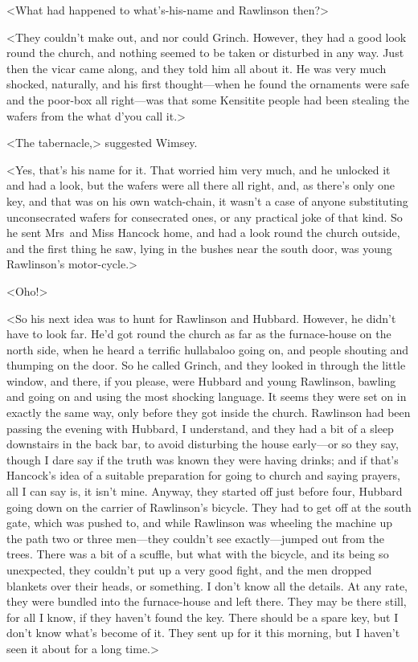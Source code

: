 <What had happened to what's-his-name and Rawlinson then?>

<They couldn't make out, and nor could Grinch. However, they had a good look round the church, and nothing seemed to be taken or disturbed in any way. Just then the vicar came along, and they told him all about it. He was very much shocked, naturally, and his first thought—when he found the ornaments were safe and the poor-box all right—was that some Kensitite people had been stealing the wafers from the what d'you call it.>

<The tabernacle,> suggested Wimsey.

<Yes, that's his name for it. That worried him very much, and he unlocked it and had a look, but the wafers were all there all right, and, as there's only one key, and that was on his own watch-chain, it wasn't a case of anyone substituting unconsecrated wafers for consecrated ones, or any practical joke of that kind. So he sent Mrs~and Miss Hancock home, and had a look round the church outside, and the first thing he saw, lying in the bushes near the south door, was young Rawlinson's motor-cycle.>

<Oho!>

<So his next idea was to hunt for Rawlinson and Hubbard. However, he didn't have to look far. He'd got round the church as far as the furnace-house on the north side, when he heard a terrific hullabaloo going on, and people shouting and thumping on the door. So he called Grinch, and they looked in through the little window, and there, if you please, were Hubbard and young Rawlinson, bawling and going on and using the most shocking language. It seems they were set on in exactly the same way, only before they got inside the church. Rawlinson had been passing the evening with Hubbard, I understand, and they had a bit of a sleep downstairs in the back bar, to avoid disturbing the house early—or so they say, though I dare say if the truth was known they were having drinks; and if that's Hancock's idea of a suitable preparation for going to church and saying prayers, all I can say is, it isn't mine. Anyway, they started off just before four, Hubbard going down on the carrier of Rawlinson's bicycle. They had to get off at the south gate, which was pushed to, and while Rawlinson was wheeling the machine up the path two or three men—they couldn't see exactly—jumped out from the trees. There was a bit of a scuffle, but what with the bicycle, and its being so unexpected, they couldn't put up a very good fight, and the men dropped blankets over their heads, or something. I don't know all the details. At any rate, they were bundled into the furnace-house and left there. They may be there still, for all I know, if they haven't found the key. There should be a spare key, but I don't know what's become of it. They sent up for it this morning, but I haven't seen it about for a long time.>


